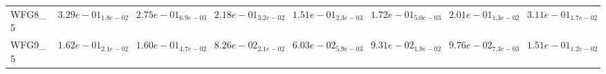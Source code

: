 \documentclass{article}
\begin{document}
\begin{landscape}
\begin{table}
\begin{scriptsize}
\begin{tabular}{llllllll}
WFG8\_5 & $  3.29e-01_{ 1.8e-02}$ & $  2.75e-01_{ 6.9e-03}$ & $  2.18e-01_{ 3.2e-02}$ & \cellcolor{gray95}$  1.51e-01_{ 2.3e-03}$ & \cellcolor{gray25}$  1.72e-01_{ 5.0e-03}$ & $  2.01e-01_{ 1.3e-02}$ & $  3.11e-01_{ 1.7e-02}$ \\
WFG9\_5 & $  1.62e-01_{ 2.1e-02}$ & $  1.60e-01_{ 4.7e-02}$ & \cellcolor{gray25}$  8.26e-02_{ 2.1e-02}$ & \cellcolor{gray95}$  6.03e-02_{ 5.9e-03}$ & $  9.31e-02_{ 1.9e-02}$ & $  9.76e-02_{ 7.3e-03}$ & $  1.51e-01_{ 1.2e-02}$ \\
\hline
\end{tabular}
\end{scriptsize}
\end{table}

\end{landscape}
\end{document}
